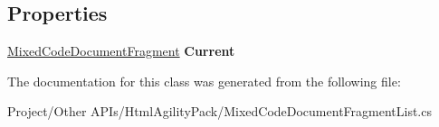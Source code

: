 \subsection*{Properties}
\begin{DoxyCompactItemize}
\item 
\mbox{\label{class_html_agility_pack_1_1_mixed_code_document_fragment_list_1_1_mixed_code_document_fragment_enumerator_a9aeb4e563dfd102fce6e061a82bdd1aa}} 
\hyperlink{class_html_agility_pack_1_1_mixed_code_document_fragment}{Mixed\+Code\+Document\+Fragment} {\bfseries Current}
\end{DoxyCompactItemize}


The documentation for this class was generated from the following file\+:\begin{DoxyCompactItemize}
\item 
Project/\+Other A\+P\+Is/\+Html\+Agility\+Pack/Mixed\+Code\+Document\+Fragment\+List.\+cs\end{DoxyCompactItemize}

